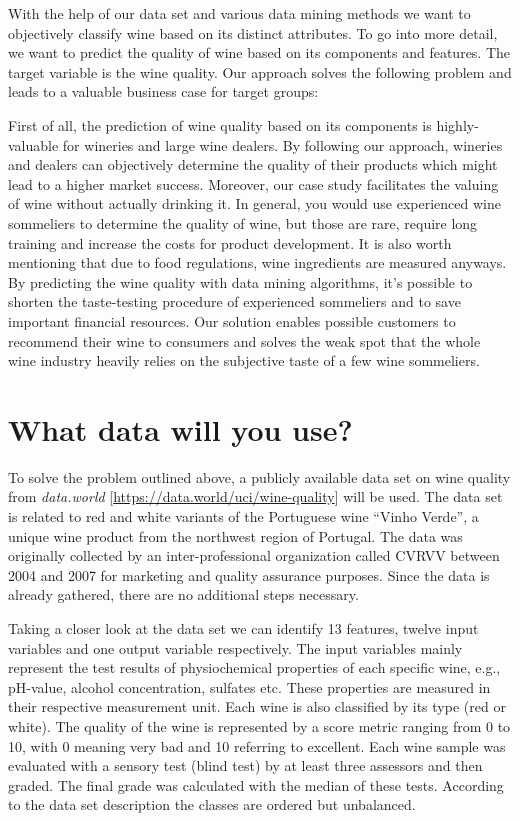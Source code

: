 \documentclass[11pt,titlepage,oneside,openany]{article}
\begin{document}
With the help of our data set and various data mining methods we want to objectively classify wine based on its distinct attributes. To go into more detail, we want to predict the quality of wine based on its components and features. The target variable is the wine quality. Our approach solves the following problem and leads to a valuable business case for target groups:

First of all, the prediction of wine quality based on its components is highly-valuable for wineries and large wine dealers. By following our approach, wineries and dealers can objectively determine the quality of their products which might lead to a higher market success. Moreover, our case study facilitates the valuing of wine without actually drinking it. In general, you would use experienced wine sommeliers to determine the quality of wine, but those are rare, require long training and increase the costs for product development. It is also worth mentioning that due to food regulations, wine ingredients are measured anyways. By predicting the wine quality with data mining algorithms, it’s possible to shorten the taste-testing procedure of experienced sommeliers and to save important financial resources. Our solution enables possible customers to recommend their wine to consumers and solves the weak spot that the whole wine industry heavily relies on the subjective taste of a few wine sommeliers.

\section{What data will you use?}
To solve the problem outlined above, a publicly available data set on wine quality from \textit{data.world} [\url{https://data.world/uci/wine-quality}] will be used. The data set is related to red and white variants of the Portuguese wine “Vinho Verde”, a unique wine product from the northwest region of Portugal. The data was originally collected by an inter-professional organization called CVRVV between 2004 and 2007 for marketing and quality assurance purposes. Since the data is already gathered, there are no additional steps necessary. 

Taking a closer look at the data set we can identify 13 features, twelve input variables and one output variable respectively. The input variables mainly represent the test results of physiochemical properties of each specific wine, e.g., pH-value, alcohol concentration, sulfates etc. These properties are measured in their respective measurement unit. Each wine is also classified by its type (red or white). The quality of the wine is represented by a score metric ranging from 0 to 10, with 0 meaning very bad and 10 referring to excellent. Each wine sample was evaluated with a sensory test (blind test) by at least three assessors and then graded. The final grade was calculated with the median of these tests. According to the data set description the classes are ordered but unbalanced.
\end{document}

